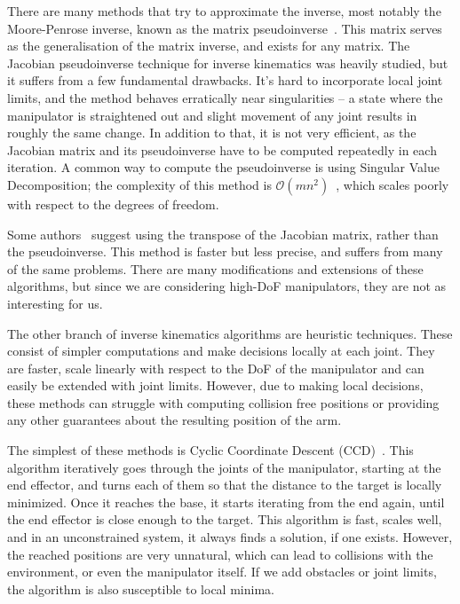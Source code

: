 There are many methods that try to approximate the inverse, most notably the Moore-Penrose inverse, known as the matrix pseudoinverse~\cite{penrose_1955}. This matrix serves as the generalisation of the matrix inverse, and exists for any matrix. The Jacobian pseudoinverse technique for inverse kinematics was heavily studied, but it suffers from a few fundamental drawbacks. It's hard to incorporate local joint limits, and the method behaves erratically near singularities -- a state where the manipulator is straightened out and slight movement of any joint results in roughly the same change.
In addition to that, it is not very efficient, as the Jacobian matrix and its pseudoinverse have to be computed repeatedly in each iteration. A common way to compute the pseudoinverse is using Singular Value Decomposition; the complexity of this method is $\mathcal{O}(mn^2)$~\cite{trefethen1997numerical}, which scales poorly with respect to the degrees of freedom.

Some authors~\cite{Wolovich1984ACT} suggest using the transpose of the Jacobian matrix, rather than the pseudoinverse. This method is faster but less precise, and suffers from many of the same problems. There are many modifications and extensions of these algorithms, but since we are considering high-DoF manipulators, they are not as interesting for us.

The other branch of inverse kinematics algorithms are heuristic techniques. These consist of simpler computations and make decisions locally at each joint. They are faster, scale linearly with respect to the DoF of the manipulator and can easily be extended with joint limits. However, due to making local decisions, these methods can struggle with computing collision free positions or providing any other guarantees about the resulting position of the arm.

The simplest of these methods is Cyclic Coordinate Descent (CCD)~\cite{ccd}. This algorithm iteratively goes through the joints of the manipulator, starting at the end effector, and turns each of them so that the distance to the target is locally minimized. Once it reaches the base, it starts iterating from the end again, until the end effector is close enough to the target. This algorithm is fast, scales well, and in an unconstrained system, it always finds a solution, if one exists. However, the reached positions are very unnatural, which can lead to collisions with the environment, or even the manipulator itself. If we add obstacles or joint limits, the algorithm is also susceptible to local minima.

